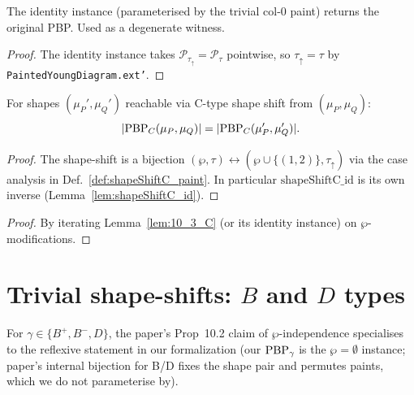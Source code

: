 \begin{lemma}
  \label{lem:shapeShiftC_id}
  \leanok
  The identity instance (parameterised by the trivial col-0 paint)
  returns the original PBP. Used as a degenerate witness.
\end{lemma}
\begin{proof}
  \leanok
  The identity instance takes $\mathcal{P}_{\tau_\uparrow} = \mathcal{P}_\tau$ pointwise, so $\tau_\uparrow = \tau$ by \texttt{PaintedYoungDiagram.ext'}.
\end{proof}


\begin{lemma}
  \label{lem:10_3_C}
  \leanok
  For shapes $(\mu_P', \mu_Q')$ reachable via C-type shape shift from $(\mu_P, \mu_Q)$:
  \[ |\mathrm{PBP}_C(\mu_P, \mu_Q)| = |\mathrm{PBP}_C(\mu_P', \mu_Q')|. \]
\end{lemma}
\begin{proof}
  \leanok
  The shape-shift is a bijection $(\wp, \tau) \leftrightarrow (\wp \cup \{(1,2)\}, \tau_\uparrow)$ via the case analysis in Def.~\ref{def:shapeShiftC_paint}. In particular $\mathrm{shapeShiftC\_id}$ is its own inverse (Lemma~\ref{lem:shapeShiftC_id}).
\end{proof}


\begin{proposition}
  \label{prop:10_2_C}
  \leanok
\end{proposition}
\begin{proof}
  \leanok
  By iterating Lemma~\ref{lem:10_3_C} (or its identity instance) on $\wp$-modifications.
\end{proof}


\section{Trivial shape-shifts: $B$ and $D$ types}

For $\gamma \in \{B^+, B^-, D\}$, the paper's Prop~10.2 claim of $\wp$-independence
specialises to the reflexive statement in our formalization (our $\mathrm{PBP}_\gamma$ is
the $\wp = \emptyset$ instance; paper's internal bijection for B/D fixes the
shape pair and permutes paints, which we do not parameterise by).

